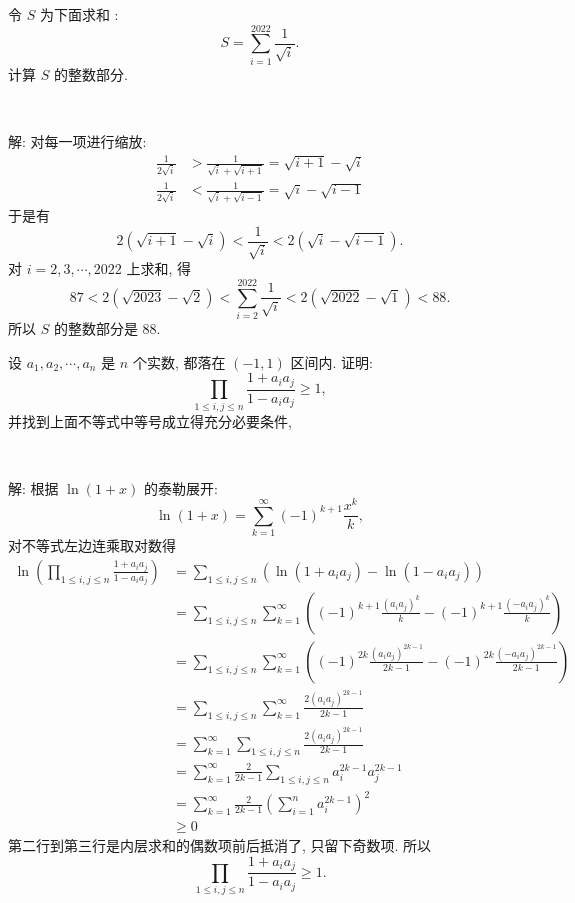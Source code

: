 \newpage

令 $S$ 为下面求和 :
\[S = \sum_{i=1}^{2022}{\frac{1}{\sqrt{i}}} .\]
计算 $S$ 的整数部分.

~

解: 对每一项进行缩放:
\begin{align*}
\frac{1}{2\sqrt{i}} &> \frac{1}{\sqrt{i}+\sqrt{i+1}} = \sqrt{i+1}-\sqrt{i} \\
\frac{1}{2\sqrt{i}} &< \frac{1}{\sqrt{i}+\sqrt{i-1}} = \sqrt{i}-\sqrt{i-1}
\end{align*}
于是有
\[2(\sqrt{i+1} - \sqrt{i}) < \frac{1}{\sqrt{i}} < 2(\sqrt{i} - \sqrt{i - 1}) .\]
对 $i=2,3,\cdots,2022$ 上求和, 得
\[87 < 2(\sqrt{2023} - \sqrt{2}) < \sum_{i=2}^{2022}{\frac{1}{\sqrt{i}}} < 2(\sqrt{2022} - \sqrt{1}) < 88 .\]
所以 $S$ 的整数部分是 88.


\newpage
设 $a_1, a_2, \cdots, a_n$ 是 $n$ 个实数, 都落在 $(-1,1)$ 区间内. 证明:
\[\prod_{1\le i,j\le n}\frac{1+a_ia_j}{1-a_ia_j} \ge 1 ,\]
并找到上面不等式中等号成立得充分必要条件,

~

解: 根据 $\ln(1+x)$ 的泰勒展开:
\[\ln(1+x) = \sum_{k=1}^\infty (-1)^{k+1}\frac{x^k}{k} ,\]
对不等式左边连乘取对数得
\begin{align*}
\ln\left(\prod_{1\le i,j\le n}\frac{1+a_ia_j}{1-a_ia_j}\right) &= \sum_{1\le i,j\le n}\left(\ln(1+a_ia_j) - \ln(1-a_ia_j)\right)\\
&= \sum_{1\le i,j\le n} \sum_{k=1}^\infty\left( (-1)^{k+1}\frac{(a_ia_j)^k}{k} -  (-1)^{k+1}\frac{(-a_ia_j)^k}{k} \right) \\
&=  \sum_{1\le i,j\le n} \sum_{k=1}^\infty\left( (-1)^{2k}\frac{(a_ia_j)^{2k-1}}{2k-1} -  (-1)^{2k}\frac{(-a_ia_j)^{2k-1}}{2k-1} \right)\\
&= \sum_{1\le i,j\le n} \sum_{k=1}^\infty \frac{2(a_ia_j)^{2k-1}}{2k-1}\\
&= \sum_{k=1}^\infty\sum_{1\le i,j\le n} \frac{2(a_ia_j)^{2k-1}}{2k-1}\\
&= \sum_{k=1}^\infty\frac{2}{2k-1}\sum_{1\le i,j\le n}a_i^{2k-1}a_j^{2k-1}\\
&= \sum_{k=1}^\infty\frac{2}{2k-1}\left(\sum_{i = 1}^n a_i^{2k-1}\right)^2 \\
&\ge 0
\end{align*}
第二行到第三行是内层求和的偶数项前后抵消了, 只留下奇数项. 所以
\[\prod_{1\le i,j\le n}\frac{1+a_ia_j}{1-a_ia_j} \ge 1 .\]


